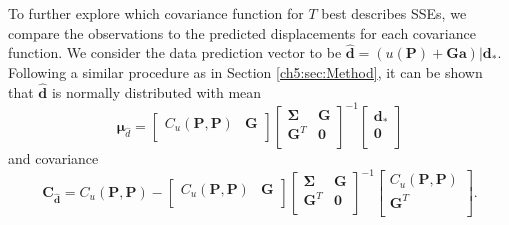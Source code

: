 To further explore which covariance function for $T$ best describes SSEs, we compare the observations to the predicted displacements for each covariance function. We consider the data prediction vector to be $\hat{\mathbf{d}} = \left(u(\mathbf{P}) + \mathbf{G}\mathbf{a}\right)|\mathbf{d}_*$. Following a similar procedure as in Section \ref{ch5:sec:Method}, it can be shown that $\hat{\mathbf{d}}$ is normally distributed with mean 
\begin{equation}\label{ch5:eq:DataPredMean}
\mathbf{\mu}_{\hat{d}} = \left[\begin{array}{cc}
                           C_u(\mathbf{P},\mathbf{P}) & \mathbf{G} \\
                           \end{array}\right]
                     \left[\begin{array}{cc}
                           \mathbf{\Sigma} & \mathbf{G} \\
                           \mathbf{G}^T  & \mathbf{0} \\
                           \end{array}\right]^{-1}
                     \left[\begin{array}{c}
                           \mathbf{d}_* \\
                           \mathbf{0} \\
                           \end{array}\right]
\end{equation}  
and covariance
\begin{equation}\label{ch5:eq:DataPredCov}
\mathbf{C}_{\hat{\mathbf{d}}} = C_u(\mathbf{P},\mathbf{P}) - 
                        \left[\begin{array}{cc}
                              C_u(\mathbf{P},\mathbf{P}) & \mathbf{G} \\
                              \end{array}\right]
                        \left[\begin{array}{cc}
                              \mathbf{\Sigma} & \mathbf{G} \\
                              \mathbf{G}^T  & \mathbf{0} \\
                              \end{array}\right]^{-1}
                        \left[\begin{array}{c}
                              C_u(\mathbf{P},\mathbf{P}) \\
                              \mathbf{G}^T \\
                              \end{array}\right].
\end{equation}
